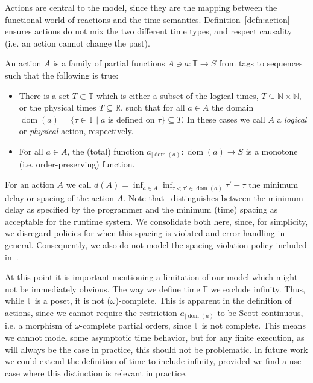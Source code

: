 Actions are central to the model, since they are the mapping between the functional world of reactions and the time semantics. 
Definition~\ref{defn:action} ensures actions do not mix the two different time types, and respect causality (i.e. an action cannot change the past).

\begin{defn}
    \label{defn:action}
An action $A$ is a family of partial functions $A \ni a : \mathbb{T} \rightarrow S$ from tags to sequences such that the following is true:
\begin{itemize}
    \item There is a set $T \subset \mathbb{T}$ which is either a subset of the logical times, $T \subseteq \mathbb{N} \times \mathbb{N}$, or the physical times $T \subseteq \mathbb{R}$, such that for all $a \in A$ the domain $\operatorname{dom}(a) = \{ \tau \in \mathbb{T} \mid a \text{ is defined on } \tau \} \subseteq T$.
    In these cases we call $A$ a \emph{logical} or \emph{physical} action, respectively.
    \item For all $a \in A$, the (total) function $a_{\big| \operatorname{dom}(a)}:\operatorname{dom}(a) \rightarrow S$ is a monotone (i.e. order-preserving) function.
\end{itemize}
\begin{defn}

For an action $A$ we call $d(A) = \operatorname{inf}_{a \in A} \operatorname{inf}_{\tau < \tau' \in \operatorname{dom}(a)} \tau' - \tau$ the minimum delay or spacing of the action $A$.
Note that~\cite{lohstroh_phdthesis} distinguishes between the minimum delay as specified by the programmer and the minimum (time) spacing as acceptable for the runtime system.
We consolidate both here, since, for simplicity, we disregard policies for when this spacing is violated and error handling in general.
Consequently, we also do not model the spacing violation policy included in~\cite{lohsroh_phdthesis}. 

At this point it is important mentioning a limitation of our model which might not be immediately obvious.
The way we define time $\mathbb{T}$ we exclude infinity. Thus, while $\mathbb{T}$ is a \ac{poset}, it is not ($\omega$)-complete.
This is apparent in the definition of actions, since we cannot require the restriction $a_{\big| \operatorname{dom}(a)}$ to be Scott-continuous, i.e. a morphism of $\omega$-complete partial orders, since $\mathbb{T}$ is not complete. 
This means we cannot model some asymptotic time behavior, but for any finite execution, as will always be the case in practice, this should not be problematic.
In future work we could extend the definition of time to include infinity, provided we find a use-case where this distinction is relevant in practice.


\end{defn}
\end{defn}
